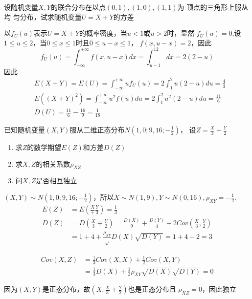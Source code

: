 \documentclass{article}
\begin{document}
\begin{examplle}[]
设随机变量\(X,Y\)的联合分布在以点\((0,1),(1,0),(1,1)\)为 顶点的三角形上服从均
匀分布，试求随机变量\(U=X+Y\)的方差

以\(f_U(u)\)表示\(U=X+Y\)的概率密度，当\(u<1\)或\(u>2\)时，显然
\(f_U(u)=0\),设\(1\le u\le2\)，当\(0\le x\le 1\)时且\(0\le u-x\le1\)，
\(f(x,u-x)=2\)，因此
\begin{equation*}
f_U(u)=\int_{-\infty}^{+\infty}f(x,u-x)dx=\int_{u-1}^12dx=2(2-u)
\end{equation*}
因此
\begin{align*}
&E(X+Y)=E(U)=\int_{-\infty}^{+\infty}uf_U(u)=2\int_1^2u(2-u)du=\frac{4}{3}\\
&E((X+Y)^2)=\int_{-\infty}^{+\infty}u^2f(u)du=2\int_1^2u^2(2-u)du=\frac{11}{6}\\
&D(U)=\frac{11}{6}-\frac{16}{9}=\frac{1}{18}
\end{align*}
\end{examplle}

\begin{examplle}[]
已知随机变量\((X,Y)\)服从二维正态分布\(N\left(1,0;9,16;-\frac{1}{2}\right)\)，
设\(Z=\frac{X}{3}+\frac{Y}{2}\)
\begin{enumerate}
\item 求\(Z\)的数学期望\(E(Z)\)和方差\(D(Z)\)
\item 求\(X,Z\)的相关系数\(\rho_{XZ}\)
\item 问\(X,Z\)是否相互独立
\end{enumerate}


\((X,Y)\sim N\left(1,0;9,16;-\frac{1}{2}\right)\)，所以\(X\sim N(1,9),Y\sim
   N(0,16),\rho_{XY}=-\frac{1}{2}\).
\begin{align*}
E(Z)&=E(\frac{X}+\frac{Y}{3})=\frac{1}{3}\\
D(Z)&=D(\frac{X}{3}+\frac{Y}{2})=\frac{D(X)}{9}+\frac{D(Y)}{4}+2Cov(\frac{X}{3},\frac{Y}{2})\\
&=1+4+\frac{\rho_{XY}}\sqrt{D(X)}\sqrt{D(Y)}=1+4-2=3
\end{align*}

\begin{align*}
Cov(X,Z)&=\frac{1}{3}Cov(X,X)+\frac{1}{2}Cov(X,Y)\\
&=\frac{1}{3}D(X)+\frac{1}{2}\rho_{XY}\sqrt{D(X)}\sqrt{D(Y)}=0
\end{align*}

因为\((X,Y)\)是正态分布，故\((X,\frac{X}{3}+\frac{Y}{2})\)也是正态分布且
\(\rho_{XZ}=0\)，因此独立
\end{examplle}
\end{document}
